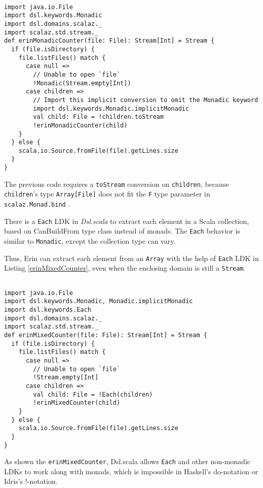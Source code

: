 \begin{lstlisting}[caption={Erin's line of code counter, the monadic version},label={erinMonadicCounter}]

import java.io.File
import dsl.keywords.Monadic
import dsl.domains.scalaz._
import scalaz.std.stream._
def erinMonadicCounter(file: File): Stream[Int] = Stream {
  if (file.isDirectory) {
    file.listFiles() match {
      case null =>
        // Unable to open `file`
        !Monadic(Stream.empty[Int])
      case children =>
        // Import this implicit conversion to omit the Monadic keyword
        import dsl.keywords.Monadic.implicitMonadic
        val child: File = !children.toStream
        !erinMonadicCounter(child)
    }
  } else {
    scala.io.Source.fromFile(file).getLines.size
  }
}
\end{lstlisting}

The previous code requires a \lstinline{toStream} conversion on \lstinline{children}, because \lstinline{children}'s type \lstinline{Array[File]} does not fit the \lstinline{F} type parameter in \lstinline{scalaz.Monad.bind} \cite{kenji2017scalaz}.

There is a \lstinline{Each} LDK in \textit{Dsl.scala} to extract each element in a Scala collection, based on {CanBuildFrom} type class instead of monads. The \lstinline{Each} behavior is similar to \lstinline{Monadic}, except the collection type can vary.

Thus, Erin can extract each element from an \lstinline{Array} with the help of \lstinline{Each} LDK in Listing \ref{erinMixedCounter},
even when the enclosing domain is still a \lstinline{Stream}.

\begin{lstlisting}[caption={Erin's line of code counter, mixed \lstinline{Monad}-based and \lstinline{CanBuildFrom}-based LDKs},label={erinMixedCounter}]

import java.io.File
import dsl.keywords.Monadic, Monadic.implicitMonadic
import dsl.keywords.Each
import dsl.domains.scalaz._
import scalaz.std.stream._
def erinMixedCounter(file: File): Stream[Int] = Stream {
  if (file.isDirectory) {
    file.listFiles() match {
      case null =>
        // Unable to open `file`
        !Stream.empty[Int]
      case children =>
        val child: File = !Each(children)
        !erinMixedCounter(child)
    }
  } else {
    scala.io.Source.fromFile(file).getLines.size
  }
}
\end{lstlisting}

As shown the \lstinline{erinMixedCounter}, Dsl.scala allows \lstinline{Each} and other non-monadic LDKs to work along with monads, which is impossible in Haskell's do-notation or Idris's !-notation.

